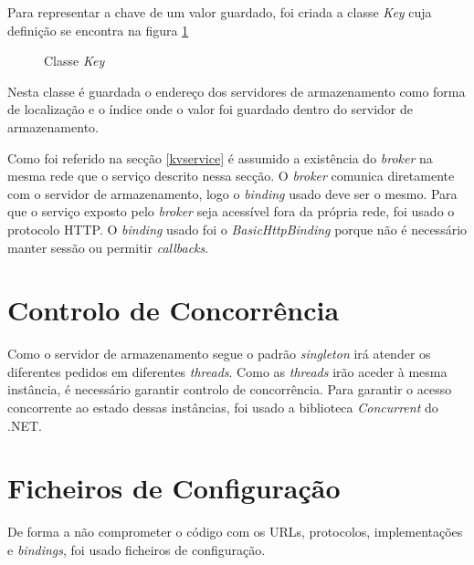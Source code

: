 Para representar a chave de um valor guardado, foi criada a classe \textit{Key} cuja definição se encontra na figura \ref{keydatacontract}

\begin{figure}[h]
	\caption{Classe \textit{Key}}
	\label{keydatacontract}
\end{figure}

Nesta classe é guardada o endereço dos servidores de armazenamento como forma de localização e o índice onde o valor foi guardado dentro do servidor de armazenamento.

Como foi referido na secção \ref{kvservice} é assumido a existência do \textit{broker} na mesma rede que o serviço descrito nessa secção. O \textit{broker} comunica diretamente com o servidor de armazenamento, logo o \textit{binding} usado deve ser o mesmo.
Para que o serviço exposto pelo \textit{broker} seja acessível fora da própria rede, foi usado o protocolo HTTP. O \textit{binding} usado foi o \textit{BasicHttpBinding} porque não é necessário manter sessão ou permitir \textit{callbacks}.

\section{Controlo de Concorrência} \label{concorrencia}

Como o servidor de armazenamento segue o padrão \textit{singleton} irá atender os diferentes pedidos em diferentes \textit{threads}. Como as \textit{threads} irão aceder à mesma instância, é necessário garantir controlo de concorrência. Para garantir o acesso concorrente ao estado dessas instâncias, foi usado a biblioteca \textit{Concurrent} do .NET.\\

\section{Ficheiros de Configuração} \label{configuracao}

De forma a não comprometer o código com os URLs, protocolos, implementações e \textit{bindings}, foi usado ficheiros de configuração.